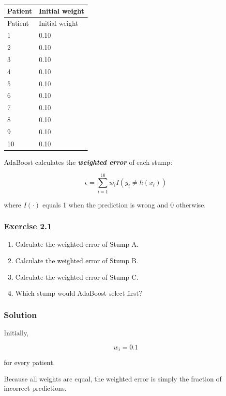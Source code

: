 \documentclass[10pt]{article}
\begin{document}
\begingroup
\small
\setlength{\tabcolsep}{4pt}
\begin{longtable}{l|l}
Patient & Initial weight \\[1.5pt]
\hline
\endfirsthead
Patient & Initial weight \\[1.5pt]
\hline
\endhead
1 & 0.10 \\[1.5pt]
2 & 0.10 \\[1.5pt]
3 & 0.10 \\[1.5pt]
4 & 0.10 \\[1.5pt]
5 & 0.10 \\[1.5pt]
6 & 0.10 \\[1.5pt]
7 & 0.10 \\[1.5pt]
8 & 0.10 \\[1.5pt]
9 & 0.10 \\[1.5pt]
10 & 0.10 \\[1.5pt]
\end{longtable}
\endgroup
AdaBoost calculates the \textbf{\textit{weighted error}} of each stump:

\[
\epsilon
=
\sum_{i=1}^{10}
w_i I(y_i\neq h(x_i))
\]

where $I(\cdot)$ equals 1 when the prediction is wrong and 0 otherwise.

\subsubsection*{Exercise 2.1}
\begin{enumerate}
\item
Calculate the weighted error of Stump A.

\item
Calculate the weighted error of Stump B.

\item
Calculate the weighted error of Stump C.

\item
Which stump would AdaBoost select first?

\end{enumerate}
\begingroup\color{red}

\subsubsection*{Solution}
Initially,

\[
w_i=0.1
\]

for every patient.

Because all weights are equal, the weighted error is simply the fraction of incorrect predictions.
\end{document}
